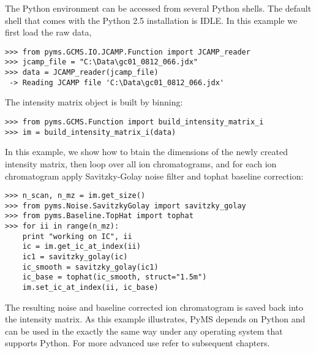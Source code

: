 The Python environment can be accessed from several Python
shells. The default shell that comes with the Python 2.5
installation is IDLE. In this example we first load the
raw data,

\begin{verbatim}
>>> from pyms.GCMS.IO.JCAMP.Function import JCAMP_reader
>>> jcamp_file = "C:\Data\gc01_0812_066.jdx"
>>> data = JCAMP_reader(jcamp_file)
 -> Reading JCAMP file 'C:\Data\gc01_0812_066.jdx'
\end{verbatim}

The intensity matrix object is built by binning:

\begin{verbatim}
>>> from pyms.GCMS.Function import build_intensity_matrix_i
>>> im = build_intensity_matrix_i(data)
\end{verbatim}

In this example, we show how to btain the dimensions of the
newly created intensity matrix, then loop over all ion chromatograms,
and for each ion chromatogram apply Savitzky-Golay noise filter
and tophat baseline correction:

\begin{verbatim}
>>> n_scan, n_mz = im.get_size()
>>> from pyms.Noise.SavitzkyGolay import savitzky_golay
>>> from pyms.Baseline.TopHat import tophat
>>> for ii in range(n_mz):
    print "working on IC", ii
    ic = im.get_ic_at_index(ii)
    ic1 = savitzky_golay(ic)
    ic_smooth = savitzky_golay(ic1)
    ic_base = tophat(ic_smooth, struct="1.5m")
    im.set_ic_at_index(ii, ic_base)
\end{verbatim}

The resulting noise and baseline corrected ion chromatogram is saved
back into the intensity matrix. As this example illustrates, PyMS
depends on Python and can be used in the exactly the same way under
any operating system that supports Python. For more advanced use
refer to subsequent chapters.

